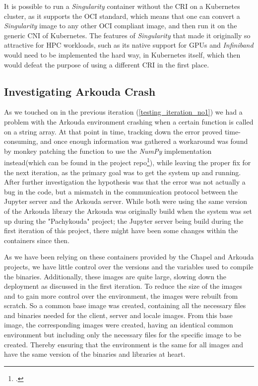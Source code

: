It is possible to run a \textit{Singularity} container without the \ac{CRI} on a Kubernetes cluster,
as it supports the \ac{OCI} standard, which means that one can convert a \textit{Singularity} image
to any other \ac{OCI} compliant image, and then run it on the generic \ac{CNI} of Kubernetes.
The features of \textit{Singularity} that made it originally so attractive for \ac{HPC} workloads,
such as its native support for \ac{GPU}s and \textit{Infiniband}
would need to be implemented the hard way, in Kubernetes itself, which then would defeat the purpose of using
a different \ac{CRI} in the first place.

\subsection{Investigating Arkouda Crash}

As we touched on in the previous iteration (\ref{testing_iteration_no1}) we had a problem with the Arkouda environment
crashing when a certain function is called on a string array. At that point in time, tracking down the error
proved time-consuming, and once enough information was gathered a workaround was found by \gls{monkey patching}
the function to use the \textit{NumPy} implementation instead(which can be found in the project repo\footcite{joneckerthBachelorThesisProjectb}),
while leaving the proper fix for the next iteration, as the primary goal was to get the system up and running.
After further investigation the hypothesis was that the error was not actually a bug in the code,
but a mismatch in the communication protocol between the Jupyter server and the Arkouda server.
While both were using the same version of the Arkouda library the Arkouda was originally
build when the system was set up during the "Pachykouda" project; the Jupyter server being build
during the first iteration of this project, there might have been some changes within the containers
since then.

As we have been relying on these containers provided by the Chapel and Arkouda projects,
we have little control over the versions and the variables used to compile the binaries.
Additionally, these images are quite large, slowing down the deployment as discussed in the first iteration.
To reduce the size of the images and to gain more control over the environment,
the images were rebuilt from scratch.
So a common base image was created, containing all the necessary files and binaries needed for the client, server and locale images.
From this base image, the corresponding images were created,
having an identical common environment but including only the necessary files
for the specific image to be created.
Thereby ensuring that the environment is the same for all images and have
the same version of the binaries and libraries at heart.

